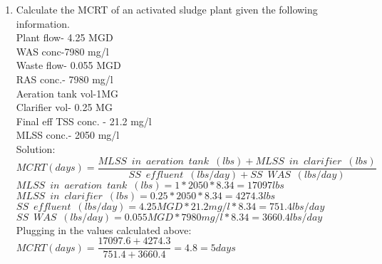 \begin{enumerate}
\item Calculate the MCRT of an activated sludge plant given the following information.\\
Plant flow- 4.25 MGD\\
WAS conc-7980 mg/l\\
Waste flow- 0.055 MGD\\
RAS conc.- 7980 mg/l\\
Aeration tank vol-1MG\\  
Clarifier vol- 0.25 MG\\
Final eff TSS conc. - 21.2 mg/l\\
MLSS conc.- 2050 mg/l\\
\vspace{0.3cm}
Solution:\\
\vspace{0.3cm}
$MCRT (days) =  \dfrac{MLSS \enspace in \enspace aeration \enspace tank \enspace (lbs)+MLSS \enspace in \enspace clarifier \enspace (lbs)}{SS \enspace effluent \enspace (lbs/day)+SS \enspace WAS \enspace (lbs/day)}$\\
\vspace{0.3cm} 
$MLSS \enspace in \enspace aeration \enspace tank \enspace (lbs)=1*2050*8.34=17097lbs$\\
\vspace{0.3cm} 
$MLSS \enspace in \enspace clarifier \enspace (lbs)=0.25*2050*8.34=4274.3lbs$\\
\vspace{0.3cm} 
$SS \enspace effluent \enspace (lbs/day)=4.25MGD *21.2mg/l*8.34=751.4lbs/day$\\
\vspace{0.3cm} 
$SS \enspace WAS \enspace (lbs/day)=0.055MGD *7980mg/l*8.34=3660.4lbs/day$\\
\vspace{0.3cm} 
Plugging in the values calculated above: $MCRT (days) =  \dfrac{17097.6+4274.3}{751.4+3660.4}=4.8=\boxed{5days}$\\
\vspace{0.2cm}
\pagebreak


\end{enumerate}

